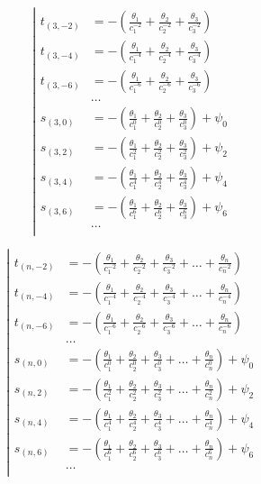 \begin{equation*} \left| \begin{aligned}
t_{(3,-2)} &=
- \left(
  \frac{\theta_1}{c_1^{-2}}
+ \frac{\theta_2}{c_2^{-2}}
+ \frac{\theta_3}{c_3^{-2}} \right) \\
%
t_{(3,-4)} &=
- \left(
  \frac{\theta_1}{c_1^{-4}}
+ \frac{\theta_2}{c_2^{-4}}
+ \frac{\theta_3}{c_3^{-4}} \right) \\
%
t_{(3,-6)} &=
- \left(
  \frac{\theta_1}{c_1^{-6}}
+ \frac{\theta_2}{c_2^{-6}}
+ \frac{\theta_3}{c_3^{-6}} \right) \\
%
&\ldots \\
%
s_{(3,0)} &=
- \left(
  \frac{\theta_1}{c_1^0}
+ \frac{\theta_2}{c_2^0}
+ \frac{\theta_3}{c_3^0} \right)
+ \psi_0 \\
%
s_{(3,2)} &=
- \left(
  \frac{\theta_1}{c_1^2}
+ \frac{\theta_2}{c_2^2}
+ \frac{\theta_3}{c_3^2} \right)
+ \psi_2 \\
%
s_{(3,4)} &=
- \left(
  \frac{\theta_1}{c_1^4}
+ \frac{\theta_2}{c_2^4}
+ \frac{\theta_3}{c_3^4} \right)
+ \psi_4 \\
%
s_{(3,6)} &=
- \left(
  \frac{\theta_1}{c_1^6}
+ \frac{\theta_2}{c_2^6}
+ \frac{\theta_3}{c_3^6} \right)
+ \psi_6 \\
%
&\ldots \\
\end{aligned} \right. \end{equation*}

\begin{equation*} \left| \begin{aligned}
t_{(n,-2)} &=
- \left(
  \frac{\theta_1}{c_1^{-2}}
+ \frac{\theta_2}{c_2^{-2}}
+ \frac{\theta_3}{c_3^{-2}}
+ \ldots
+ \frac{\theta_n}{c_n^{-2}} \right) \\
%
t_{(n,-4)} &=
- \left(
  \frac{\theta_1}{c_1^{-4}}
+ \frac{\theta_2}{c_2^{-4}}
+ \frac{\theta_3}{c_3^{-4}}
+ \ldots
+ \frac{\theta_n}{c_n^{-4}} \right) \\
%
t_{(n,-6)} &=
- \left(
  \frac{\theta_1}{c_1^{-6}}
+ \frac{\theta_2}{c_2^{-6}}
+ \frac{\theta_3}{c_3^{-6}}
+ \ldots
+ \frac{\theta_n}{c_n^{-6}} \right) \\
%
&\ldots \\
%
s_{(n,0)} &=
- \left(
  \frac{\theta_1}{c_1^0}
+ \frac{\theta_2}{c_2^0}
+ \frac{\theta_3}{c_3^0}
+ \ldots
+ \frac{\theta_n}{c_n^0} \right)
+ \psi_0 \\
%
s_{(n,2)} &=
- \left(
  \frac{\theta_1}{c_1^2}
+ \frac{\theta_2}{c_2^2}
+ \frac{\theta_3}{c_3^2}
+ \ldots
+ \frac{\theta_n}{c_n^2} \right)
+ \psi_2 \\
%
s_{(n,4)} &=
- \left(
  \frac{\theta_1}{c_1^4}
+ \frac{\theta_2}{c_2^4}
+ \frac{\theta_3}{c_3^4}
+ \ldots
+ \frac{\theta_n}{c_n^4} \right)
+ \psi_4 \\
%
s_{(n,6)} &=
- \left(
  \frac{\theta_1}{c_1^6}
+ \frac{\theta_2}{c_2^6}
+ \frac{\theta_3}{c_3^6}
+ \ldots
+ \frac{\theta_n}{c_n^6} \right)
+ \psi_6 \\
%
&\ldots \\
\end{aligned} \right. \end{equation*}